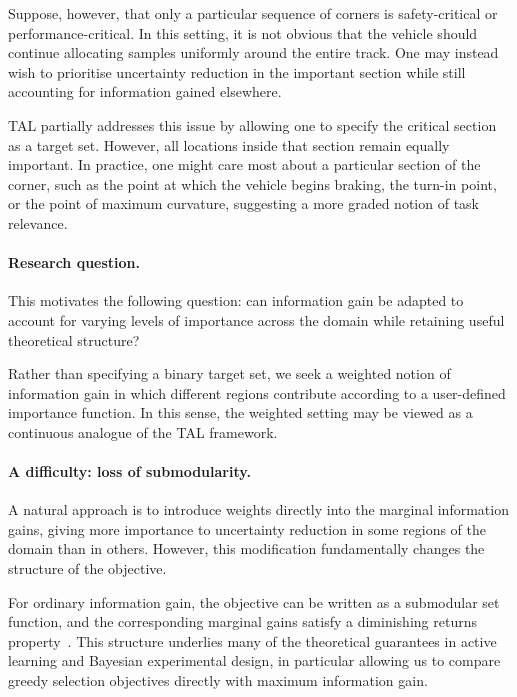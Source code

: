 Suppose, however, that only a particular sequence of corners is safety-critical or performance-critical. In this setting, it is not obvious that the vehicle should continue allocating samples uniformly around the entire track. One may instead wish to prioritise uncertainty reduction in the important section while still accounting for information gained elsewhere.

TAL partially addresses this issue by allowing one to specify the critical section as a target set. However, all locations inside that section remain equally important. In practice, one might care most about a particular section of the corner, such as the point at which the vehicle begins braking, the turn-in point, or the point of maximum curvature, suggesting a more graded notion of task relevance.

\paragraph{Research question.}

This motivates the following question: can information gain be adapted to account for varying levels of importance across the domain while retaining useful theoretical structure?

Rather than specifying a binary target set, we seek a weighted notion of information gain in which different regions contribute according to a user-defined importance function. In this sense, the weighted setting may be viewed as a continuous analogue of the TAL framework.

\paragraph{A difficulty: loss of submodularity.}

A natural approach is to introduce weights directly into the marginal information gains, giving more importance to uncertainty reduction in some regions of the domain than in others. However, this modification fundamentally changes the structure of the objective.

For ordinary information gain, the objective can be written as a submodular set function, and the corresponding marginal gains satisfy a diminishing returns property~\cite{Krause2008}. This structure underlies many of the theoretical guarantees in active learning and Bayesian experimental design, in particular allowing us to compare greedy selection objectives directly with maximum information gain.

